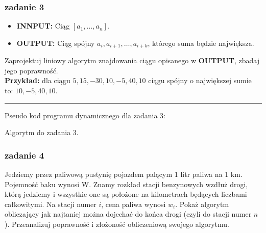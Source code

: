 \documentclass[11pt,a4paper]{article}
\begin{document}
\subsubsection{zadanie 3}
\begin{itemize}
    \item \textbf{INNPUT:} Ciąg $[a_1, \dots , a_n]$.
    \item \textbf{OUTPUT:} Ciąg spójny $a_i, a_{i+1},\dots , a_{i+k}$, którego suma będzie największa.
\end{itemize}
Zaprojektuj liniowy algorytm znajdowania ciągu opisanego w \textbf{OUTPUT}, zbadaj jego poprawność.\\
\textbf{Przykład:} dla ciągu $5, 15, -30, 10, -5, 40, 10$ ciągu spójny o największej sumie to: $10, -5, 40, 10$.

\bigskip
\hrule
\bigskip

Pseudo kod programu dynamicznego dla zadania 3:
\begin{algorithm}
    \caption{Algorytm do zadania 3.}
    \begin{algorithmic}[1]
            \Else
            \EndIf
            \EndIf
        \EndFor
        \State {} %
        \EndProcedure
    \end{algorithmic}
\end{algorithm}


\subsubsection{zadanie 4}
Jedziemy przez paliwową pustynię pojazdem palącym 1 litr paliwa na 1 km. Pojemność baku wynosi W. Znamy rozkład stacji benzynowych wzdłuż drogi, którą jedziemy i wszystkie one są położone na kilometrach będących liczbami całkowitymi. Na stacji numer $i$, cena paliwa wynosi $w_i$. Pokaż algorytm obliczający jak najtaniej można dojechać do końca drogi (czyli do stacji numer $n$). Przeanalizuj poprawność i złożoność obliczeniową swojego algorytmu.

\bigskip
\hline
\bigskip
\end{document}
